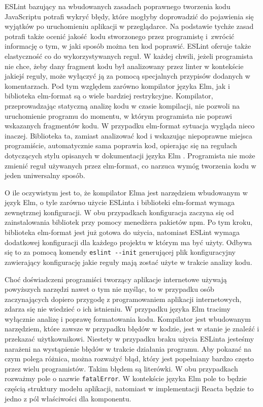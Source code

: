 ESLint bazujący na wbudowanych zasadach poprawnego tworzenia kodu JavaScriptu potrafi wykryć błędy, które mogłyby doprowadzić do pojawienia się wyjątków po uruchomieniu aplikacji w przeglądarce. Na podstawie tychże zasad potrafi także ocenić jakość kodu stworzonego przez programistę i~zwrócić informację o tym, w jaki sposób można ten kod poprawić. ESLint oferuje także elastyczność co do wykorzystywanych reguł. W każdej chwili, jeżeli programista nie chce, żeby dany fragment kodu był analizowany przez linter w kontekście jakiejś reguły, może wyłączyć ją za pomocą specjalnych przypisów dodanych w komentarzach. Pod tym względem zarówno kompilator języka Elm, jak i biblioteka elm-format są o wiele bardziej restrykcyjne. Kompilator, przeprowadzając statyczną analizę kodu w czasie kompilacji, nie pozwoli na uruchomienie programu do momentu, w którym programista nie poprawi wskazanych fragmentów kodu. W przypadku elm-format sytuacja wygląda nieco inaczej. Biblioteka ta, zamiast analizować kod i wskazując niepoprawne miejsca programiście, automatycznie sama poprawia kod, opierając się na regułach dotyczących stylu opisanych w dokumentacji języka Elm \cite{elmStyleGuide}. Programista nie może zmienić reguł używanych przez elm-format, co narzuca wymóg tworzenia kodu w jeden uniwersalny sposób.

O ile oczywistym jest to, że kompilator Elma jest narzędziem wbudowanym w język Elm, o tyle zarówno użycie ESLinta i biblioteki elm-format wymaga zewnętrznej konfiguracji. W obu przypadkach konfiguracja zaczyna się od zainstalowania bibliotek przy pomocy menedżera pakietów npm. Po tym kroku, biblioteka elm-format jest już gotowa do użycia, natomiast ESLint wymaga dodatkowej konfiguracji dla każdego projektu w którym ma być użyty. Odbywa się to za pomocą komendy \lstinline{eslint --init} generującej plik konfiguracyjny zawierający konfigurację jakie reguły mają zostać użyte w trakcie analizy kodu.

Choć doświadczeni programiści tworzący aplikacje internetowe używają powyższych narzędzi nawet o tym nie myśląc, to w przypadku osób zaczynających dopiero przygodę z programowaniem aplikacji internetowych, zdarza się nie wiedzieć o ich istnieniu. W przypadku języka Elm tracimy wyłącznie analizę i poprawę formatowania kodu. Kompilator jest wbudowanym narzędziem, które zawsze w przypadku błędów w kodzie, jest w stanie je znaleźć i przekazać użytkownikowi. Niestety w przypadku braku użycia ESLinta jesteśmy narażeni na wystąpienie błędów w trakcie działania programu. Aby pokazać na czym polega różnica, można rozważyć błąd, który jest popełniany bardzo często przez wielu programistów. Takim błędem są literówki. W obu przypadkach rozważmy pole o nazwie \lstinline{fatalError}. W kontekście języka Elm pole to będzie częścią struktury modelu aplikacji, natomiast w implementacji Reacta będzie to jedno z pól właściwości dla komponentu.

